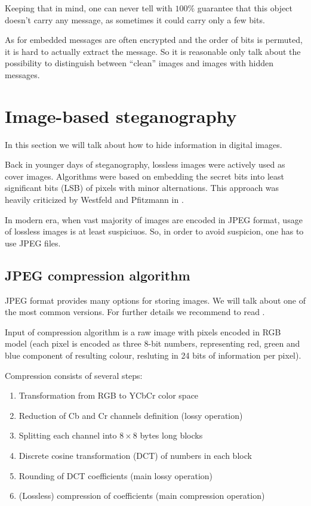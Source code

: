 Keeping that in mind, one can never tell with $100\%$
guarantee that this object doesn't carry any message, as sometimes it could carry only a few bits.

As for embedded messages are often encrypted and the order of bits is permuted, it is hard
to actually extract the message. So it is reasonable only talk about the possibility to
distinguish between ``clean'' images and images with hidden messages. 

\section{Image-based steganography}
\label{sec:image-steganography}

In this section we will talk about how to hide information in digital images.

Back in younger days of steganography, lossless images were actively used as cover images.
Algorithms were based on embedding the secret bits into least significant bits (LSB) of pixels
with minor alternations. This approach was heavily criticized by Westfeld and Pfitzmann in \cite{westfeld1999attacks}.

In modern era, when vast majority of images are encoded in JPEG format, usage of lossless images
is at least suspiciuos. So, in order to avoid suspicion, one has to use JPEG files.

\subsection{JPEG compression algorithm}
\label{sec:jpeg}

JPEG format provides many options for storing images. We will talk about
one of the most common versions. For further details we recommend to read \cite{wallace1992jpeg}.

Input of compression algorithm is a raw image with pixels encoded
in RGB model (each pixel is encoded as three 8-bit numbers, representing
red, green and blue component of resulting colour, resluting in 24 bits of information
per pixel).

Compression consists of several steps:
\begin{enumerate}
    \item Transformation from RGB to YCbCr color space
    \item Reduction of Cb and Cr channels definition (lossy operation)
    \item Splitting each channel into $8 \times 8$ bytes long blocks 
    \item Discrete cosine transformation (DCT) of numbers in each block
    \item Rounding of DCT coefficients (main lossy operation)
    \item (Lossless) compression of coefficients (main compression operation)
\end{enumerate}

